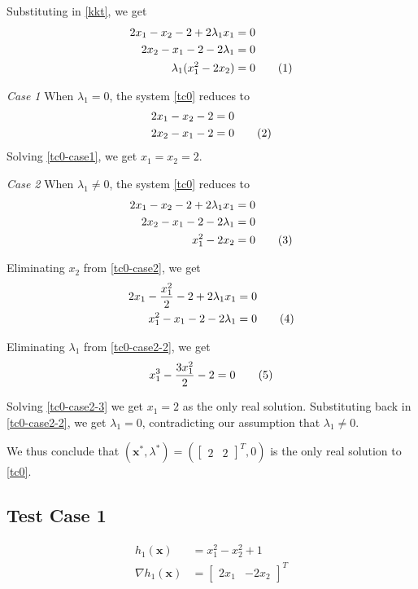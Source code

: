 \documentclass[a4paper]{article}
\newcommand{\numberthis}{\addtocounter{equation}{1}\tag{\theequation}}
\newcommand{\labeleqn}[1]{\numberthis \label{#1}}
\newcommand{\case}[1]{\numberthis \vspace*{10px} \textit{Case #1} \hspace*{2.5px}}
\begin{document}
Substituting in \eqref{kkt}, we get
\begin{align*}
2 x_1 - x_2 - 2 + 2 \lambda_1 x_1 &= 0 \\
2 x_2 - x_1 - 2 - 2 \lambda_1 &= 0 \\
\lambda_1 (x_1^2 - 2 x_2) &= 0 \labeleqn{tc0}
\end{align*}

\case{1} When $\lambda_1 = 0$, the system \eqref{tc0} reduces to
\begin{align*}
2 x_1 - x_2 - 2 &= 0 \\
2 x_2 - x_1 - 2 &= 0 \labeleqn{tc0-case1}
\end{align*}
Solving \eqref{tc0-case1}, we get $x_1 = x_2 = 2$.

\case{2} When $\lambda_1 \neq 0$, the system \eqref{tc0} reduces to
\begin{align*}
2 x_1 - x_2 - 2 + 2 \lambda_1 x_1 &= 0 \\
2 x_2 - x_1 - 2 - 2 \lambda_1 &= 0 \\
x_1^2 - 2 x_2 &= 0 \labeleqn{tc0-case2}
\end{align*}

Eliminating $x_2$ from \eqref{tc0-case2}, we get
\begin{align*}
2 x_1 - \frac{x_1^2}{2} - 2 + 2 \lambda_1 x_1 &= 0 \\
x_1^2 - x_1 - 2 - 2 \lambda_1 &= 0 \labeleqn{tc0-case2-2}
\end{align*}

Eliminating $\lambda_1$ from \eqref{tc0-case2-2}, we get
\begin{align*}
x_1^3 - \frac{3x_1^2}{2} - 2 = 0 \labeleqn{tc0-case2-3}
\end{align*}

Solving \eqref{tc0-case2-3} we get $x_1 = 2$ as the only real solution. Substituting back in \eqref{tc0-case2-2}, we get $\lambda_1 = 0$, contradicting our assumption that $\lambda_1 \neq 0$.

We thus conclude that $(\textbf{x}^*, \lambda^*) = \left( \begin{bmatrix} 2 & 2 \end{bmatrix} ^T, 0 \right)$ is the only real solution to \eqref{tc0}.

\subsection{Test Case 1}

\begin{align*}
h_1(\textbf{x}) &= x_1^2 - x_2^2 + 1 \\
\nabla h_1(\textbf{x}) &= \begin{bmatrix} 2 x_1 & -2 x_2 \end{bmatrix} ^T \\
\end{align*}
\end{document}
